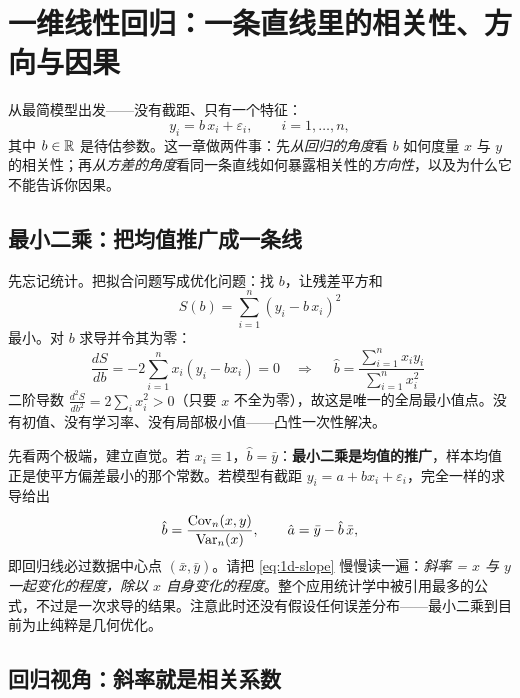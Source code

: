 \section{一维线性回归：一条直线里的相关性、方向与因果}\label{sec:onedim}

从最简模型出发——没有截距、只有一个特征：
\begin{equation}\label{eq:1d-model}
  y_i = b\, x_i + \varepsilon_i, \qquad i = 1, \dots, n,
\end{equation}
其中 $b \in \mathbb{R}$ 是待估参数。这一章做两件事：先\textit{从回归的角度}看 $b$ 如何度量 $x$ 与 $y$ 的相关性；再\textit{从方差的角度}看同一条直线如何暴露相关性的\textit{方向性}，以及为什么它不能告诉你因果。

\subsection{最小二乘：把均值推广成一条线}\label{sec:1d-ls}

先忘记统计。把拟合问题写成优化问题：找 $b$，让残差平方和
\begin{equation}\label{eq:1d-rss}
  S(b) = \sum_{i=1}^n (y_i - b\, x_i)^2
\end{equation}
最小。对 $b$ 求导并令其为零：
\[
  \frac{dS}{db} = -2 \sum_{i=1}^n x_i (y_i - b x_i) = 0
  \quad\Longrightarrow\quad
  \boxed{\;\hat{b} = \frac{\sum_{i=1}^n x_i y_i}{\sum_{i=1}^n x_i^2}\;}
\]
二阶导数 $\frac{d^2 S}{db^2} = 2 \sum_i x_i^2 > 0$（只要 $x$ 不全为零），故这是唯一的全局最小值点。没有初值、没有学习率、没有局部极小值——凸性一次性解决。

先看两个极端，建立直觉。若 $x_i \equiv 1$，$\hat{b} = \bar{y}$：\textbf{最小二乘是均值的推广}，样本均值正是使平方偏差最小的那个常数。若模型有截距 $y_i = a + b x_i + \varepsilon_i$，完全一样的求导给出
\begin{equation}\label{eq:1d-slope}
  \hat{b} = \frac{\mathrm{Cov}_n(x, y)}{\mathrm{Var}_n(x)}, \qquad \hat{a} = \bar{y} - \hat{b}\,\bar{x},
\end{equation}
即回归线必过数据中心点 $(\bar{x}, \bar{y})$。请把 \eqref{eq:1d-slope} 慢慢读一遍：\textit{斜率 = $x$ 与 $y$ 一起变化的程度，除以 $x$ 自身变化的程度}。整个应用统计学中被引用最多的公式，不过是一次求导的结果。注意此时还没有假设任何误差分布——最小二乘到目前为止纯粹是几何优化。

\subsection{回归视角：斜率就是相关系数}\label{sec:1d-corr}

